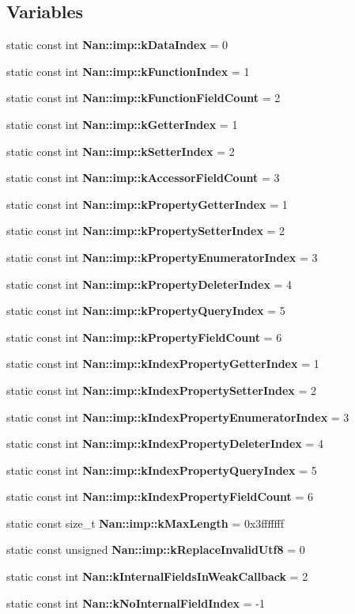 \subsection*{Variables}
\begin{DoxyCompactItemize}
\item 
static const int \textbf{ Nan\+::imp\+::k\+Data\+Index} = 0
\item 
static const int \textbf{ Nan\+::imp\+::k\+Function\+Index} = 1
\item 
static const int \textbf{ Nan\+::imp\+::k\+Function\+Field\+Count} = 2
\item 
static const int \textbf{ Nan\+::imp\+::k\+Getter\+Index} = 1
\item 
static const int \textbf{ Nan\+::imp\+::k\+Setter\+Index} = 2
\item 
static const int \textbf{ Nan\+::imp\+::k\+Accessor\+Field\+Count} = 3
\item 
static const int \textbf{ Nan\+::imp\+::k\+Property\+Getter\+Index} = 1
\item 
static const int \textbf{ Nan\+::imp\+::k\+Property\+Setter\+Index} = 2
\item 
static const int \textbf{ Nan\+::imp\+::k\+Property\+Enumerator\+Index} = 3
\item 
static const int \textbf{ Nan\+::imp\+::k\+Property\+Deleter\+Index} = 4
\item 
static const int \textbf{ Nan\+::imp\+::k\+Property\+Query\+Index} = 5
\item 
static const int \textbf{ Nan\+::imp\+::k\+Property\+Field\+Count} = 6
\item 
static const int \textbf{ Nan\+::imp\+::k\+Index\+Property\+Getter\+Index} = 1
\item 
static const int \textbf{ Nan\+::imp\+::k\+Index\+Property\+Setter\+Index} = 2
\item 
static const int \textbf{ Nan\+::imp\+::k\+Index\+Property\+Enumerator\+Index} = 3
\item 
static const int \textbf{ Nan\+::imp\+::k\+Index\+Property\+Deleter\+Index} = 4
\item 
static const int \textbf{ Nan\+::imp\+::k\+Index\+Property\+Query\+Index} = 5
\item 
static const int \textbf{ Nan\+::imp\+::k\+Index\+Property\+Field\+Count} = 6
\item 
static const size\+\_\+t \textbf{ Nan\+::imp\+::k\+Max\+Length} = 0x3fffffff
\item 
static const unsigned \textbf{ Nan\+::imp\+::k\+Replace\+Invalid\+Utf8} = 0
\item 
static const int \textbf{ Nan\+::k\+Internal\+Fields\+In\+Weak\+Callback} = 2
\item 
static const int \textbf{ Nan\+::k\+No\+Internal\+Field\+Index} = -\/1
\end{DoxyCompactItemize}


